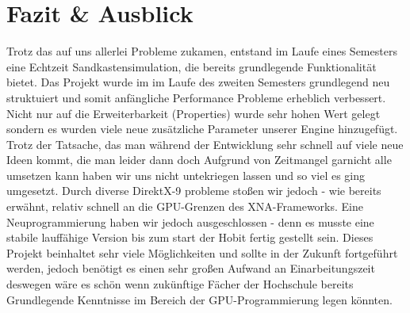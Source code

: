 \chapter{Fazit \& Ausblick}
	\begin{Spacing}{\mylinespace}
	Trotz das auf uns allerlei Probleme zukamen, entstand im Laufe eines Semesters eine Echtzeit Sandkastensimulation, die bereits grundlegende Funktionalität bietet. 
	Das Projekt wurde im  im Laufe des zweiten Semesters grundlegend neu struktuiert und somit anfängliche Performance Probleme erheblich verbessert.
	Nicht nur auf die Erweiterbarkeit (Properties) wurde sehr hohen Wert gelegt sondern es wurden viele neue zusätzliche Parameter unserer Engine hinzugefügt.
	Trotz der Tatsache, das man während der Entwicklung sehr schnell auf viele neue Ideen kommt, die man leider dann doch Aufgrund von Zeitmangel garnicht alle umsetzen kann haben wir uns nicht untekriegen lassen und so viel es ging umgesetzt. Durch diverse DirektX-9 probleme stoßen wir jedoch - wie bereits erwähnt, relativ schnell an die GPU-Grenzen des XNA-Frameworks.
	Eine Neuprogrammierung haben wir jedoch ausgeschlossen - denn es musste eine stabile lauffähige Version bis zum start der Hobit fertig gestellt sein.
	Dieses Projekt beinhaltet sehr viele Möglichkeiten und sollte in der Zukunft fortgeführt werden, jedoch benötigt es einen sehr großen Aufwand an Einarbeitungszeit deswegen wäre es schön wenn zukünftige Fächer der Hochschule bereits Grundlegende Kenntnisse im Bereich der GPU-Programmierung legen könnten.
	
\end{Spacing}
\newpage
\clearpage
